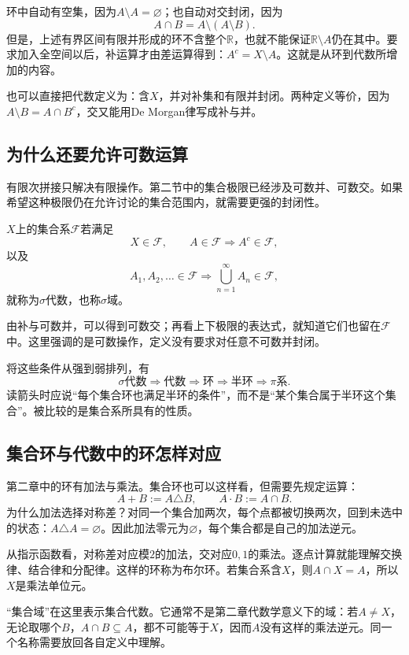 环中自动有空集，因为$A\setminus A=\varnothing$；也自动对交封闭，因为
\[
 A\cap B=A\setminus(A\setminus B).
\]
但是，上述有界区间有限并形成的环不含整个$\mathbb R$，也就不能保证$\mathbb R\setminus A$仍在其中。要求加入全空间以后，补运算才由差运算得到：$A^c=X\setminus A$。这就是从环到代数所增加的内容。

也可以直接把代数定义为：含$X$，并对补集和有限并封闭。两种定义等价，因为$A\setminus B=A\cap B^c$，交又能用De Morgan律写成补与并。

\subsection{为什么还要允许可数运算}

有限次拼接只解决有限操作。第二节中的集合极限已经涉及可数并、可数交。如果希望这种极限仍在允许讨论的集合范围内，就需要更强的封闭性。

\begin{definition}[$\sigma$代数]
$X$上的集合系$\mathcal F$若满足
\[
 X\in\mathcal F,\qquad
 A\in\mathcal F\Rightarrow A^c\in\mathcal F,
\]
以及
\[
 A_1,A_2,\ldots\in\mathcal F
 \Rightarrow\bigcup_{n=1}^{\infty}A_n\in\mathcal F,
\]
就称为$\sigma$代数，也称$\sigma$域。
\end{definition}

由补与可数并，可以得到可数交；再看上下极限的表达式，就知道它们也留在$\mathcal F$中。这里强调的是可数操作，定义没有要求对任意不可数并封闭。

将这些条件从强到弱排列，有
\[
 \sigma\text{代数}\Longrightarrow\text{代数}
 \Longrightarrow\text{环}\Longrightarrow\text{半环}
 \Longrightarrow\pi\text{系}.
\]
读箭头时应说“每个集合环也满足半环的条件”，而不是“某个集合属于半环这个集合”。被比较的是集合系所具有的性质。

\subsection{集合环与代数中的环怎样对应}

第二章中的环有加法与乘法。集合环也可以这样看，但需要先规定运算：
\[
 A+B:=A\triangle B,\qquad A\cdot B:=A\cap B.
\]
为什么加法选择对称差？对同一个集合加两次，每个点都被切换两次，回到未选中的状态：$A\triangle A=\varnothing$。因此加法零元为$\varnothing$，每个集合都是自己的加法逆元。

从指示函数看，对称差对应模$2$的加法，交对应$0,1$的乘法。逐点计算就能理解交换律、结合律和分配律。这样的环称为布尔环。若集合系含$X$，则$A\cap X=A$，所以$X$是乘法单位元。

“集合域”在这里表示集合代数。它通常不是第二章代数学意义下的域：若$A\ne X$，无论取哪个$B$，$A\cap B\subseteq A$，都不可能等于$X$，因而$A$没有这样的乘法逆元。同一个名称需要放回各自定义中理解。

